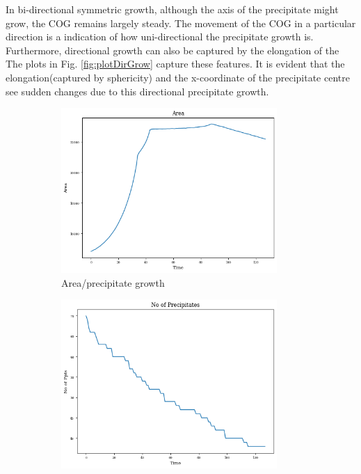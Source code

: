 \documentclass[12pt, a4paper]{report}
\begin{document}
In bi-directional symmetric growth, although the axis of the precipitate might grow, the COG remains largely steady. The movement of the COG in a particular direction is a indication of how uni-directional the precipitate growth is. Furthermore, directional growth can also be captured by the elongation of the The plots in Fig. \ref{fig:plotDirGrow} capture these features. It is evident that the elongation(captured by sphericity) and the x-coordinate of the precipitate centre see sudden changes due to this directional precipitate growth. 

\begin{figure}[H]
\centering
\begin{subfigure}{.45\textwidth}
  \centering
  \includegraphics[width=0.9\textwidth]{Pictures/Results/1area.jpeg}
  \caption{Area/precipitate growth}
  \label{img:microstrImg}
\end{subfigure}
\begin{subfigure}{.45\textwidth}
  \centering
  \includegraphics[width=0.9\textwidth]{Pictures/Results/1ppts.jpeg}

\end{subfigure}
\end{figure}
\end{document}
